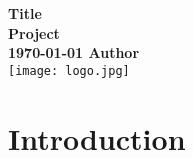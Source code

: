 \documentclass[a4paper,11pt]{article}
\title{\gettitle}
\date{\today}
\author{\getauthor}
\newcommand{\gettitle}{Title}
\newcommand{\getproject}{Project}
\newcommand{\getauthor}{Author}
\begin{document}
\begin{titlepage}
    \centering
    \vfill
    {\bfseries\Large
        \gettitle\\
        \getproject\\
        \today 
        \vskip2cm
        \getauthor\\
    }    
    \vfill
    \texttt{[image: logo.jpg]}
    \vfill
    \vfill
\end{titlepage}

\newpage

\tableofcontents

\newpage

\section{Introduction}


 
\end{document}
